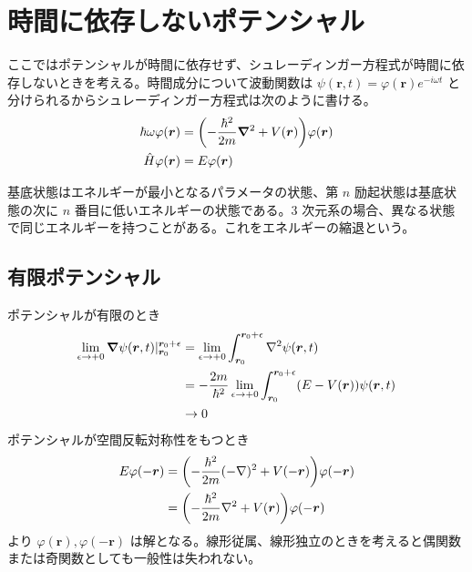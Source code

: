 \documentclass[uplatex,dvipdfmx,a4paper,11pt]{jlreq}
\newcommand{\rr}{\bm{r}}
\theoremstyle{definition}
\begin{document}
\section{時間に依存しないポテンシャル}
ここではポテンシャルが時間に依存せず、シュレーディンガー方程式が時間に依存しないときを考える。時間成分について波動関数は $\psi(\rr, t) = \varphi(\rr)e^{-i\omega t}$ と分けられるからシュレーディンガー方程式は次のように書ける。
\begin{align}
  \hbar\omega\varphi(\rr) & = \qty(-\frac{\hbar^2}{2m}\vnabla^2 + V(\rr))\varphi(\rr) \\
  \hat{H}\varphi(\rr)     & = E\varphi(\rr)
\end{align}

\begin{definition}[エネルギーの縮退]
  基底状態はエネルギーが最小となるパラメータの状態、第 $n$ 励起状態は基底状態の次に $n$ 番目に低いエネルギーの状態である。3 次元系の場合、異なる状態で同じエネルギーを持つことがある。これをエネルギーの縮退という。
\end{definition}

\subsection{有限ポテンシャル}
ポテンシャルが有限のとき
\begin{align}
  \lim_{\epsilon\to +0}\vnabla\psi(\rr, t)|_{\rr_0}^{\rr_0 + \epsilon} & = \lim_{\epsilon\to +0}\int_{\rr_0}^{\rr_0 + \epsilon}\nabla^2\psi(\rr, t)                        \\
                                                                       & = -\frac{2m}{\hbar^2}\lim_{\epsilon\to +0}\int_{\rr_0}^{\rr_0 + \epsilon}(E - V(\rr))\psi(\rr, t) \\
                                                                       & \to 0
\end{align}
ポテンシャルが空間反転対称性をもつとき
\begin{align}
  E\varphi(-\rr) & = \qty(-\frac{\hbar^2}{2m}(-\nabla)^2 + V(-\rr))\varphi(-\rr) \\
                 & = \qty(-\frac{\hbar^2}{2m}\nabla^2 + V(\rr))\varphi(-\rr)
\end{align}
より $\varphi(\rr), \varphi(-\rr)$ は解となる。線形従属、線形独立のときを考えると偶関数または奇関数としても一般性は失われない。
\end{document}
